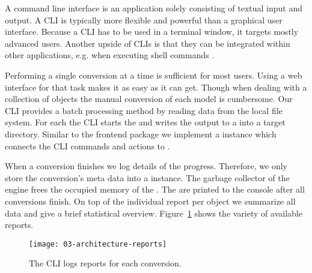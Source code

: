 \documentclass[../../ClassicThesis.tex]{subfiles}
\begin{document}
A command line interface is an application solely consisting of
textual input and output. A CLI is typically more flexible and
powerful than a graphical user interface. Because a CLI has to be used
in a terminal window, it targets mostly advanced users. Another upside
of CLIs is that they can be integrated within other applications,
e.g. when executing shell commands \cite{cli}.

Performing a single conversion at a time is sufficient for most
users. Using a web interface for that task makes it as easy as it can
get. Though when dealing with a collection of objects the manual
conversion of each model is cumbersome. Our CLI provides a batch
processing method by reading data from the local file system. For each
{\stlfile} the CLI starts the  and writes the
output to a {\zipfile} into a target directory. Similar to the
frontend package we implement a  instance which
connects the CLI commands and actions to {\convertify}.

When a conversion finishes we log details of the progress.
Therefore, we only store the conversion's meta data into a
 instance. The garbage collector of
the {\javascript} engine frees the occupied memory of the
{\threedmodel}. The  are printed to the
console after all conversions finish. On top of the
individual report per object we summarize all data and give
a brief statistical overview. Figure~\ref{fig:reports} shows
the variety of available reports.

\begin{figure}
  \centering
  \texttt{[image: 03-architecture-reports]}
  \caption{The CLI logs reports for each conversion.}
  \label{fig:reports}
\end{figure}











\end{document}

